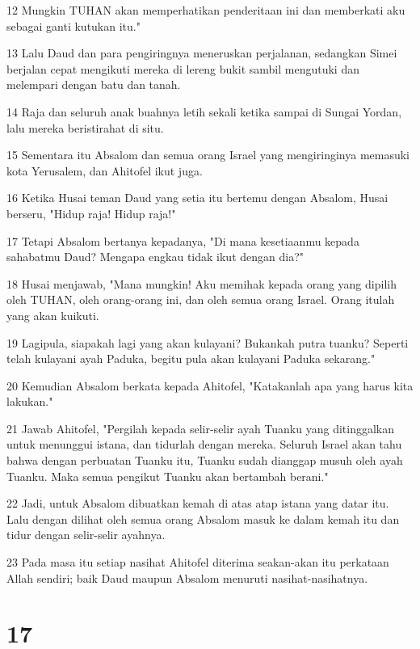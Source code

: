 \par 12 Mungkin TUHAN akan memperhatikan penderitaan ini dan memberkati aku sebagai ganti kutukan itu."
\par 13 Lalu Daud dan para pengiringnya meneruskan perjalanan, sedangkan Simei berjalan cepat mengikuti mereka di lereng bukit sambil mengutuki dan melempari dengan batu dan tanah.
\par 14 Raja dan seluruh anak buahnya letih sekali ketika sampai di Sungai Yordan, lalu mereka beristirahat di situ.
\par 15 Sementara itu Absalom dan semua orang Israel yang mengiringinya memasuki kota Yerusalem, dan Ahitofel ikut juga.
\par 16 Ketika Husai teman Daud yang setia itu bertemu dengan Absalom, Husai berseru, "Hidup raja! Hidup raja!"
\par 17 Tetapi Absalom bertanya kepadanya, "Di mana kesetiaanmu kepada sahabatmu Daud? Mengapa engkau tidak ikut dengan dia?"
\par 18 Husai menjawab, "Mana mungkin! Aku memihak kepada orang yang dipilih oleh TUHAN, oleh orang-orang ini, dan oleh semua orang Israel. Orang itulah yang akan kuikuti.
\par 19 Lagipula, siapakah lagi yang akan kulayani? Bukankah putra tuanku? Seperti telah kulayani ayah Paduka, begitu pula akan kulayani Paduka sekarang."
\par 20 Kemudian Absalom berkata kepada Ahitofel, "Katakanlah apa yang harus kita lakukan."
\par 21 Jawab Ahitofel, "Pergilah kepada selir-selir ayah Tuanku yang ditinggalkan untuk menunggui istana, dan tidurlah dengan mereka. Seluruh Israel akan tahu bahwa dengan perbuatan Tuanku itu, Tuanku sudah dianggap musuh oleh ayah Tuanku. Maka semua pengikut Tuanku akan bertambah berani."
\par 22 Jadi, untuk Absalom dibuatkan kemah di atas atap istana yang datar itu. Lalu dengan dilihat oleh semua orang Absalom masuk ke dalam kemah itu dan tidur dengan selir-selir ayahnya.
\par 23 Pada masa itu setiap nasihat Ahitofel diterima seakan-akan itu perkataan Allah sendiri; baik Daud maupun Absalom menuruti nasihat-nasihatnya.

\chapter{17}

